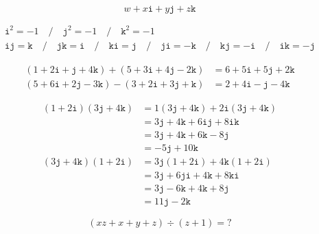 \documentclass{jlreq}
\newcommand{\ii}{\mathtt{i}}
\newcommand{\jj}{\mathtt{j}}
\newcommand{\kk}{\mathtt{k}}
\begin{document}
\begin{preview}
    \begin{equation}
        w + x \ii + y \jj + z \kk
    \end{equation}
\end{preview}

\begin{preview}
    \begin{gather}
        \ii^2 = -1 \quad / \quad \jj^2 = -1 \quad / \quad \kk^2 = -1 \\
        \ii \jj = \kk \quad / \quad \jj \kk = \ii \quad / \quad \kk \ii = \jj \quad / \quad \jj \ii = -\kk \quad / \quad \kk \jj = -\ii \quad / \quad \ii \kk = -\jj
    \end{gather}
\end{preview}

\begin{preview}
    \begin{align}
        (1 + 2 \ii + \jj + 4 \kk) + (5 + 3 \ii + 4 \jj - 2 \kk) & = 6 + 5 \ii + 5 \jj + 2 \kk \\
        (5 + 6 \ii + 2 \jj - 3 \kk) - (3 + 2 \ii + 3 \jj + \kk) & = 2 + 4 \ii - \jj - 4 \kk
    \end{align}
\end{preview}

\begin{preview}
    \begin{align}
        (1 + 2 \ii)(3 \jj + 4 \kk) & = 1 (3 \jj + 4 \kk) + 2 \ii (3 \jj + 4 \kk) \\
                                   & = 3 \jj + 4 \kk + 6 \ii \jj + 8 \ii \kk     \\
                                   & = 3 \jj + 4 \kk + 6 \kk - 8 \jj             \\
                                   & = -5 \jj + 10 \kk                           \\
        (3 \jj + 4 \kk)(1 + 2 \ii) & = 3 \jj (1 + 2 \ii) + 4 \kk (1 + 2 \ii)     \\
                                   & = 3 \jj + 6 \jj \ii + 4 \kk + 8 \kk \ii     \\
                                   & = 3 \jj - 6 \kk + 4 \kk + 8 \jj             \\
                                   & = 11 \jj - 2 \kk
    \end{align}
\end{preview}

\begin{preview}
    \begin{equation}
        (xz + x + y + z) \div (z + 1) = ?
    \end{equation}
\end{preview}
\end{document}
